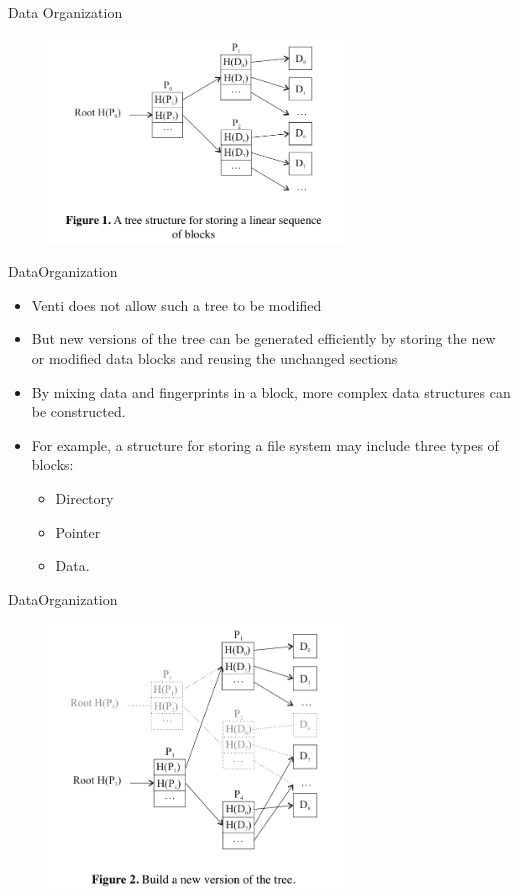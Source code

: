 \begin{frame}{Data Organization}

\begin{figure}
\includegraphics[width = 8cm]{pic1.png}
\end{figure}

\end{frame}

\begin{frame}{DataOrganization}

\begin{itemize}
\itemsep1pt\parskip0pt
\item
  Venti does not allow such a tree to be modified
\item
  But new versions of the tree can be generated efficiently by storing
  the new or modified data blocks and reusing the unchanged sections
\item
  By mixing data and fingerprints in a block, more complex data
  structures can be constructed.
\item
  For example, a structure for storing a file system may include three
  types of blocks:

  \begin{itemize}
  \itemsep1pt\parskip0pt
  \item
    Directory
  \item
    Pointer
  \item
    Data.
  \end{itemize}
\end{itemize}

\end{frame}

\begin{frame}{DataOrganization}

\begin{figure}
\includegraphics[width = 8cm]{pic2.png}
\end{figure}

\end{frame}

